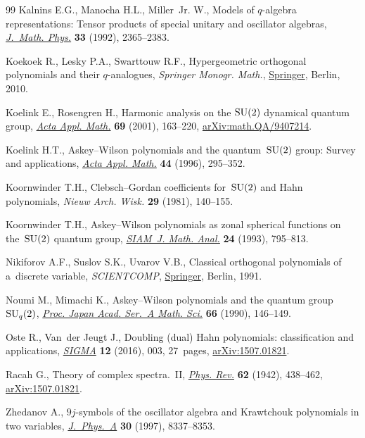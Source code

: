 \documentclass[10pt,a4paper]{amsart}
\numberwithin{equation}{section}
\theoremstyle{definition}
\begin{document}
\begin{thebibliography}{99}
Kalnins E.G., Manocha H.L., Miller~Jr. W., Models of {$q$}-algebra
 representations: {T}ensor products of special unitary and oscillator
 algebras, \href{https://doi.org/10.1063/1.529607}{\textit{J.~Math. Phys.}}
 \textbf{33} (1992), 2365--2383.

Koekoek R., Lesky P.A., Swarttouw R.F., Hypergeometric orthogonal polynomials
 and their {$q$}-analogues, \textit{Springer Monogr. Math.},
 \href{https://doi.org/10.1007/978-3-642-05014-5}{Springer}, Berlin, 2010.

Koelink E., Rosengren H., Harmonic analysis on the {${\rm SU}(2)$} dynamical
 quantum group, \href{https://doi.org/10.1023/A:1013071729320}{\textit{Acta
 Appl. Math.}} \textbf{69} (2001), 163--220,
 \href{http://arxiv.org/abs/math.QA/9407214}{arXiv:math.QA/9407214}.

Koelink H.T., Askey--{W}ilson polynomials and the quantum~{${\rm SU}(2)$}
 group: {S}urvey and applications,
 \href{https://doi.org/10.1007/BF00047396}{\textit{Acta Appl. Math.}}
 \textbf{44} (1996), 295--352.

Koornwinder T.H., Clebsch--{G}ordan coefficients for~{${\rm SU}(2)$} and {H}ahn
 polynomials, \textit{Nieuw Arch. Wisk.} \textbf{29} (1981), 140--155.

Koornwinder T.H., Askey--{W}ilson polynomials as zonal spherical functions on
 the~{${\rm SU}(2)$} quantum group,
 \href{https://doi.org/10.1137/0524049}{\textit{SIAM~J. Math. Anal.}}
 \textbf{24} (1993), 795--813.

Nikiforov A.F., Suslov S.K., Uvarov V.B., Classical orthogonal polynomials of a~discrete variable, \textit{SCIENTCOMP},
 \href{https://doi.org/10.1007/978-3-642-74748-9}{Springer}, Berlin, 1991.

Noumi M., Mimachi K., Askey--{W}ilson polynomials and the quantum group~{${\rm
 SU}_q(2)$}, \href{https://doi.org/10.3792/pjaa.66.146}{\textit{Proc. Japan
 Acad. Ser.~A Math. Sci.}} \textbf{66} (1990), 146--149.

Oste R., Van~der Jeugt J., Doubling (dual) {H}ahn polynomials: classification
 and applications,
 \href{https://doi.org/10.3842/SIGMA.2016.003}{\textit{SIGMA}} \textbf{12}
 (2016), 003, 27~pages,
 \href{http://arxiv.org/abs/1507.01821}{arXiv:1507.01821}.

Racah G., Theory of complex spectra.~{II},
 \href{https://doi.org/10.1103/PhysRev.62.438}{\textit{Phys. Rev.}}
 \textbf{62} (1942), 438--462,
 \href{http://arxiv.org/abs/1507.01821}{arXiv:1507.01821}.

Zhedanov A., {$9j$}-symbols of the oscillator algebra and {K}rawtchouk
 polynomials in two variables,
 \href{https://doi.org/10.1088/0305-4470/30/23/029}{\textit{J.~Phys.~A}}
 \textbf{30} (1997), 8337--8353.

\end{thebibliography}
\end{document}
